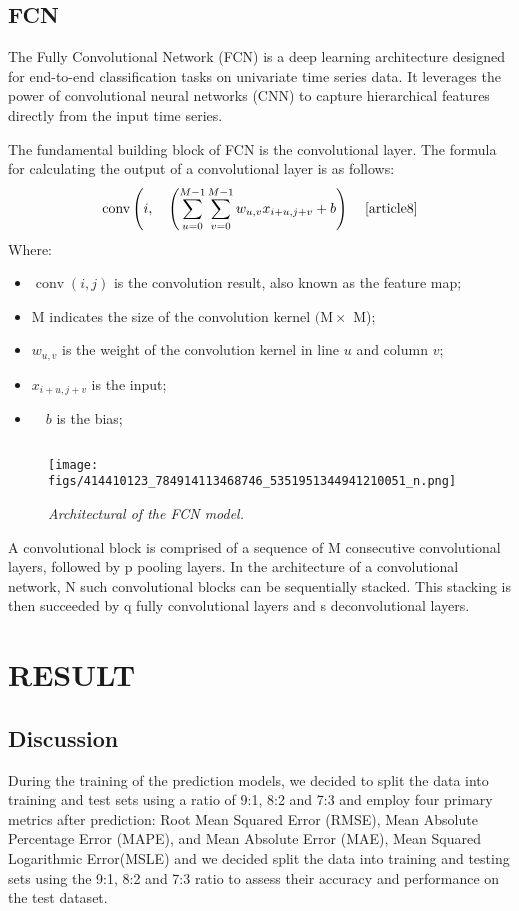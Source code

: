 \documentclass{ieeeojies}
\begin{document}
\subsection{FCN}
\hspace{0.3cm}The Fully Convolutional Network (FCN) is a deep learning architecture designed for end-to-end classification tasks on univariate time series data. It leverages the power of convolutional neural networks (CNN) to capture hierarchical features directly from the input time series.

The fundamental building block of FCN is the convolutional layer. The formula for calculating the output of a convolutional layer is as follows:
$$
\operatorname{conv}\left(i, \quad\left(\sum_{u=0}^{M-1} \sum_{v=0}^{M-1} w_{u, v} x_{i+u, j+v}+b\right)\right. \quad \cite{article8}
$$
Where:
 \begin{itemize}
     \item $\operatorname{conv}(i, j)$ is the convolution result, also known as the feature map;
     \item $\mathrm{M}$ indicates the size of the convolution kernel $(\mathrm{M} \times$ M);
     \item $w_{u, v}$ is the weight of the convolution kernel in line $u$ and column $v$;
     \item $x_{i+u, j+v}$ is the input;
     \item $\quad b$ is the bias;
 \end{itemize}
 $$
 
\vspace{-1cm}
\begin{figure}[H]
    \centering
    \texttt{[image: figs/414410123\_784914113468746\_5351951344941210051\_n.png]}
    \caption{\centering \textit{Architectural of the FCN model.}}
    \label{fig:enter-label}
\end{figure}

\hspace{0.3cm}A convolutional block is comprised of a sequence of M consecutive convolutional layers, followed by p pooling layers. In the architecture of a convolutional network, N such convolutional blocks can be sequentially stacked. This stacking is then succeeded by q fully convolutional layers and s deconvolutional layers.

\section{\centering RESULT}
\subsection{Discussion}
During the training of the prediction models, we decided to split the data into training and test sets using a ratio of 9:1, 8:2 and 7:3 and employ four primary metrics after prediction: Root Mean Squared Error (RMSE), Mean Absolute Percentage Error (MAPE), and Mean Absolute Error (MAE), Mean Squared Logarithmic Error(MSLE) and we decided split the data into training and testing sets using the 9:1, 8:2 and 7:3 ratio  to assess their accuracy and performance on the test dataset.
\end{document}
